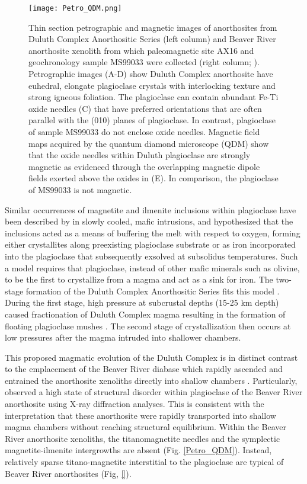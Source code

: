 \documentclass[draft]{agujournal2019}
\begin{document}
\begin{figure}
\noindent\texttt{[image: Petro\_QDM.png]}
\caption{\footnotesize{Thin section petrographic and magnetic images of anorthosites from Duluth Complex Anorthositic Series (left column) and Beaver River anorthosite xenolith from which paleomagnetic site AX16 and geochronology sample MS99033 were collected (right column; ). Petrographic images (A-D) show Duluth Complex anorthosite have euhedral, elongate plagioclase crystals with interlocking texture and strong igneous foliation. The plagioclase can contain abundant Fe-Ti oxide needles (C) that have preferred orientations that are often parallel with the (010) planes of plagioclase. In contrast, plagioclase of sample MS99033 do not enclose oxide needles. Magnetic field maps acquired by the quantum diamond microscope (QDM) show that the oxide needles within Duluth plagioclase are strongly magnetic as evidenced through the overlapping magnetic dipole fields exerted above the oxides in (E). In comparison, the plagioclase of MS99033 is not magnetic. }}
\label{fig:Petro_QDM}
\end{figure}

Similar occurrences of magnetite and ilmenite inclusions within plagioclase have been described by  in slowly cooled, mafic intrusions, and \cite{Scofield1986a} hypothesized that the inclusions acted as a means of buffering the melt with respect to oxygen, forming either crystallites along preexisting plagioclase substrate or as iron incorporated into the plagioclase that subsequently exsolved at subsolidus temperatures. Such a model requires that plagioclase, instead of other mafic minerals such as olivine, to be the first to crystallize from a magma and act as a sink for iron. The two-stage formation of the Duluth Complex Anorthositic Series fits this model \cite{Miller1990a}. During the first stage, high pressure at subcrustal depths (15-25 km depth) caused fractionation of Duluth Complex magma resulting in the formation of floating plagioclase mushes \cite{Kushiro1980a}. The second stage of crystallization then occurs at low pressures after the magma intruded into shallower chambers. 

This proposed magmatic evolution of the Duluth Complex is in distinct contrast to the emplacement of the Beaver River diabase which rapidly ascended and entrained the anorthosite xenoliths directly into shallow chambers \cite{Flower1980a, Miller1997a, Zhang2021b}. Particularly,  observed a high state of structural disorder within plagioclase of the Beaver River anorthosite using X-ray diffraction analyses. This is consistent with the interpretation that these anorthosite were rapidly transported into shallow magma chambers without reaching structural equilibrium. Within the Beaver River anorthosite xenoliths, the titanomagnetite needles and the symplectic magnetite-ilmenite intergrowths are absent (Fig. \ref{Petro_QDM}). Instead, relatively sparse titano-magnetite interstitial to the plagioclase are typical of Beaver River anorthosites (Fig, \ref{}). 
\end{document}
